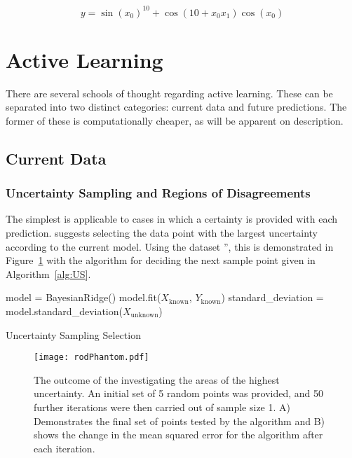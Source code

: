 \begin{equation}
  y = \sin{(x_0)}^{10} + \cos{(10 + x_0 x_1)}\cos{(x_0)}
  \label{eq:phantom}
\end{equation}

\section{Active Learning}
\label{ch:Active Learning}

There are several schools of thought regarding active learning. These can be separated into two distinct categories: current data and future predictions. The former of these is computationally cheaper, as will be apparent on description.

\subsection{Current Data}
\subsubsection{Uncertainty Sampling and Regions of Disagreements}
\label{sec:UncertaintySampling}

The simplest is applicable to cases in which a certainty is provided with each prediction. \textcite{Set09} suggests selecting the data point with the largest uncertainty according to the current model. Using the dataset '', this is demonstrated in Figure~\ref{fig:rodPhantom} with the algorithm for deciding the next sample point given in Algorithm~\ref{alg:US}.

\begin{algorithm}[h]
  model = BayesianRidge()\;
  model.fit($X_\mathrm{known}$, $Y_\mathrm{known}$)\;
  standard\_deviation = model.standard\_deviation($X_\mathrm{unknown}$)\;
  \caption{Uncertainty Sampling Selection}
  \label{alg:US}\SetAlgoLined
\end{algorithm}


\begin{figure}[H]
  \begin{center}
    \texttt{[image: rodPhantom.pdf]}
    \caption[Uncertainty Sampling Demonstration]{The outcome of the investigating the areas of the highest uncertainty. An initial set of 5 random points was provided, and 50 further iterations were then carried out of sample size 1. A) Demonstrates the final set of points tested by the algorithm and B) shows the change in the mean squared error for the algorithm after each iteration.}
    \label{fig:rodPhantom}
  \end{center}
\end{figure}

